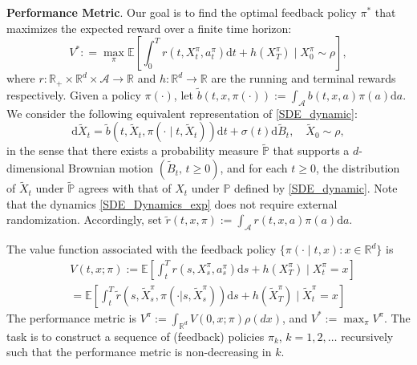 \documentclass{article}
\theoremstyle{plain}
\theoremstyle{definition}
\theoremstyle{remark}
\begin{document}
\textbf{Performance Metric}. Our goal is to find the optimal feedback policy $\pi^*$ that maximizes the expected reward over a finite time horizon:
\begin{equation}
\label{Discounted Objective 2}
{V^*: =} \max_{\pi} \mathbb{E}\left[\int_0^{T}r\left(t, X_t^\pi, a_t^\pi\right) \mathrm{d} t +h(X^{\pi}_T)\mid X_0^\pi\sim \rho \right],
\end{equation}
where $r:\mathbb{R}_+ \times \mathbb{R}^d \times \mathcal{A} \to \mathbb{R}$ and $h: \mathbb{R}^d \to \mathbb{R}$ are the running and terminal rewards respectively. 
Given a policy $\pi(\cdot)$, let $\tilde{b}(t,x, \pi(\cdot)):=\int_{\mathcal{A}} b(t,x, a) \pi(a) \mathrm{d} a$.
We consider the following equivalent representation of \eqref{SDE_dynamic}:
\begin{equation}
\label{SDE_Dynamics_exp}
\mathrm{d} \tilde{X}_t = \tilde{b}\left(t,\tilde{X}_t, \pi(\cdot \mid  t,\tilde{X}_t)\right) \mathrm{d} t+\sigma(t) \mathrm{d} \tilde{B}_t, \quad \tilde{X}_0\sim \rho  ,
\end{equation}
in the sense that
there exists a probability measure $\tilde{\mathbb{P}}$ 
that supports a $d$-dimensional Brownian motion $(\tilde{B}_t, \, t \ge 0)$, 
and for each $t \geq 0$, the distribution of $\tilde{X}_t$ under $\tilde{\mathbb{P}}$ agrees with that of $X_t$ under $\mathbb{P}$ defined by \eqref{SDE_dynamic}. 
Note that the dynamics \eqref{SDE_Dynamics_exp} does not require external randomization. Accordingly, set
$\tilde{r}(t,x,\pi):=\int_{\mathcal{A}} r(t,x, a) \pi(a) \mathrm{d} a$.

The value function associated with the feedback policy $\{\pi(\cdot \mid t, x): x \in \mathbb{R}^d\}$ is
\begin{align}
\label{Value function Definition}
&V( t, x ; \pi):=
\mathbb{E} \left[\int_t^{T} r\left(s, X_s^\pi, a_s^\pi\right) \mathrm{d} s +h\left(X_T^{\pi}\right)\mid X_t^\pi = x \right] \nonumber\\
&= \mathbb{E} \left[\int_t^{T}\tilde{r}(s,\tilde{X}_s^\pi, \pi(\cdot |s,\tilde{X}_s^\pi)) \mathrm{d} s+ h(\tilde{X}_T^{\pi})\mid \tilde{X}_t^\pi=x\right]
\end{align}
The performance metric is $V^\pi := \int_{\mathbb{R}^d} V(0, x; \pi) \rho(dx)$, and 
$V^* := \max_\pi V^\pi$. 
The task is to 
 construct a sequence of (feedback) policies $\pi_k$, $k = 1,2,\ldots$ recursively such that 
the performance metric is non-decreasing in $k$.
\end{document}
